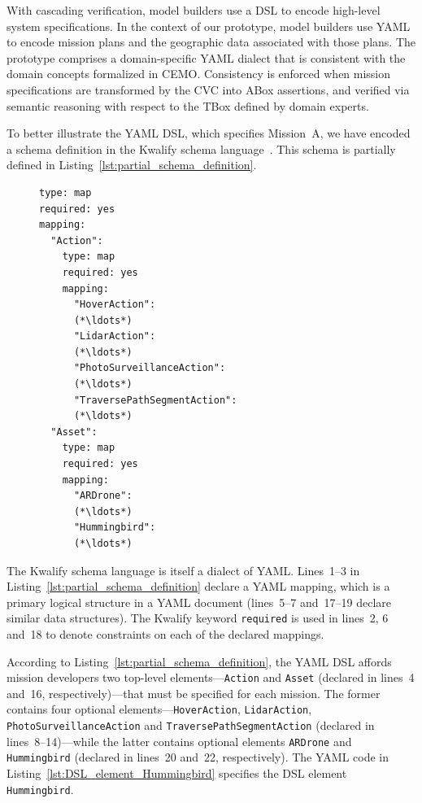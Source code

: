 With cascading verification, model builders use a DSL to encode high-level system specifications. In the context of our prototype, model builders use YAML to encode mission plans and the geographic data associated with those plans. The prototype comprises a domain-specific YAML dialect that is consistent with the domain concepts formalized in CEMO\@. Consistency is enforced when mission specifications are transformed by the CVC into ABox assertions, and verified via semantic reasoning with respect to the TBox defined by domain experts.

To better illustrate the YAML DSL, which specifies Mission~A, we have encoded a schema definition in the Kwalify schema language~\cite{Kuwata_2011}. This schema is partially defined in Listing~\ref{lst:partial_schema_definition}.

\begin{figure}[ht]
\begin{lstlisting}[caption={Partial schema definition for the YAML DSL},label=lst:partial_schema_definition]
type: map
required: yes
mapping:
  "Action":
    type: map
    required: yes
    mapping:
      "HoverAction":
      (*\ldots*)
      "LidarAction":
      (*\ldots*)
      "PhotoSurveillanceAction":
      (*\ldots*)
      "TraversePathSegmentAction":
      (*\ldots*)
  "Asset":
    type: map
    required: yes
    mapping:
      "ARDrone":
      (*\ldots*)
      "Hummingbird":
      (*\ldots*)
\end{lstlisting}
\end{figure}

The Kwalify schema language is itself a dialect of YAML\@. Lines~1--3 in Listing~\ref{lst:partial_schema_definition} declare a YAML mapping, which is a primary logical structure in a YAML document (lines~5--7 and~17--19 declare similar data structures). The Kwalify keyword \texttt{required} is used in lines~2, 6 and~18 to denote constraints on each of the declared mappings.

According to Listing~\ref{lst:partial_schema_definition}, the YAML DSL affords mission developers two top-level elements---\texttt{Action} and \texttt{Asset} (declared in lines~4 and~16, respectively)---that must be specified for each mission. The former contains four optional elements---\texttt{HoverAction}, \texttt{LidarAction}, \texttt{PhotoSurveillanceAction} and \texttt{TraversePathSegmentAction} (declared in lines~8--14)---while the latter contains optional elements \texttt{ARDrone} and \texttt{Hummingbird} (declared in lines~20 and~22, respectively). The YAML code in Listing~\ref{lst:DSL_element_Hummingbird} specifies the DSL element \texttt{Hummingbird}.

